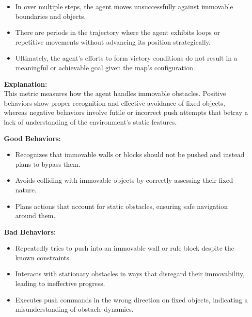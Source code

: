 \begin{tcolorbox}
\begin{itemize}
		\item In over multiple steps, the agent moves unsuccessfully against
			immovable boundaries and objects.

		\item There are periods in the trajectory where the agent exhibits loops or repetitive
			movements without advancing its position strategically.

		\item Ultimately, the agent's efforts to form victory conditions do not
			result in a meaningful or achievable goal given the map's configuration.
	\end{itemize}
\end{tcolorbox}

\fontsize{9.5pt}{11pt}\selectfont
\begin{tcolorbox}
	[ colback=gray!5!white, colframe=gray!90, title=\textbf{\textcolor{black}{Iteration
	3: Interaction with Immovable Obstacles}}]

	\textbf{Explanation:} \\ This metric measures how the agent handles immovable obstacles.
	Positive behaviors show proper recognition and effective avoidance of fixed
	objects, whereas negative behaviors involve futile or incorrect push attempts that
	betray a lack of understanding of the environment’s static features.

	\vspace{1em}
	\textbf{Good Behaviors:}
	\begin{itemize}
		\item Recognizes that immovable walls or blocks should not be pushed and instead
			plans to bypass them.

		\item Avoids colliding with immovable objects by correctly assessing their fixed
			nature.

		\item Plans actions that account for static obstacles, ensuring safe
			navigation around them.
	\end{itemize}

	\vspace{0.5em}
	\textbf{Bad Behaviors:}
	\begin{itemize}
		\item Repeatedly tries to push into an immovable wall or rule block despite the
			known constraints.

		\item Interacts with stationary obstacles in ways that disregard their immovability,
			leading to ineffective progress.

		\item Executes push commands in the wrong direction on fixed objects,
			indicating a misunderstanding of obstacle dynamics.
	\end{itemize}
\end{tcolorbox}